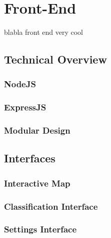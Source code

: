\section{Front-End}
blabla front end very cool 
\subsection{Technical Overview}
\subsubsection{NodeJS}
\subsubsection{ExpressJS}
\subsubsection{Modular Design}

\subsection{Interfaces}
\subsubsection{Interactive Map}
\subsubsection{Classification Interface}
\subsubsection{Settings Interface}